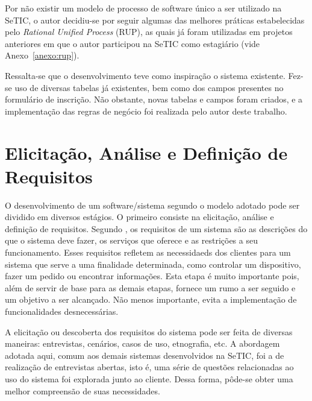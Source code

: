 \documentclass[
  10.5pt,				  %
	openright,			%
	twoside,			  %
  a5paper,
  chapter=TITLE,	%
	section=TITLE,	%
  hyphens,        %
	english,        %
	brazil          %
]{abntex2}
\begin{document}
Por não existir um modelo de processo de software único a ser utilizado na SeTIC, o autor decidiu-se por seguir algumas das melhores práticas estabelecidas pelo \emph{Rational Unified Process} (RUP), as quais já foram utilizadas em projetos anteriores em que o autor participou na SeTIC como estagiário (vide Anexo~\ref{anexo:rup}).


Ressalta-se que o desenvolvimento teve como inspiração o sistema existente. Fez-se uso de diversas tabelas já existentes, bem como dos campos presentes no formulário de inscrição. Não obstante, novas tabelas e campos foram criados, e a implementação das regras de negócio foi realizada pelo autor deste trabalho.


\section{Elicitação, Análise e Definição de Requisitos}

O desenvolvimento de um software/sistema segundo o modelo adotado pode ser dividido em diversos estágios. O primeiro consiste na elicitação, análise e definição de requisitos. Segundo , os requisitos de um sistema são as descrições do que o sistema deve fazer, os serviços que oferece e as restrições a seu funcionamento. Esses requisitos refletem as necessidaeds dos clientes para um sistema que serve a uma finalidade determinada, como controlar um dispositivo, fazer um pedido ou encontrar informações. Esta etapa é muito importante pois, além de servir de base para as demais etapas, fornece um rumo a ser seguido e um objetivo a ser alcançado. Não menos importante, evita a implementação de funcionalidades desnecessárias.

A elicitação ou descoberta dos requisitos do sistema pode ser feita de diversas maneiras: entrevistas, cenários, casos de uso, etnografia, etc. A abordagem adotada aqui, comum aos demais sistemas desenvolvidos na SeTIC, foi a de realização de entrevistas abertas, isto é, uma série de questões relacionadas ao uso do sistema foi explorada junto ao cliente. Dessa forma, pôde-se obter uma melhor compreensão de suas necessidades.
\end{document}
